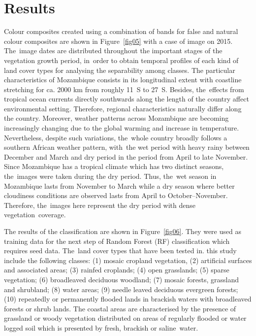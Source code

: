 \documentclass[coasts,article,accept,pdftex,oneauthor]{Definitions/mdpi}
\begin{document}
\section{Results}

Colour composites created using a combination of bands for false and natural colour composites are shown in Figure~\ref{fig05} with a case of image on 2015. The~image dates are distributed throughout the important stages of the vegetation growth period, in~order to obtain temporal profiles of each kind of land cover types for analysing the separability among classes. {The particular characteristics of Mozambique consists in its longitudinal extent with coastline stretching for ca. 2000 km from roughly 11\degree~S to 27\degree~S. Besides, the~effects from tropical ocean currents directly southwards along the length of the country affect environmental setting. Therefore, regional characteristics naturally differ along the country. Moreover, weather patterns across Mozambique are becoming increasingly changing due to the global warming and increase in temperature. Nevertheless, despite such variations, the~whole country broadly follows a southern African weather pattern, with~the wet period with heavy rainy between December and March and dry period in the period from April to late November. }Since Mozambique has a tropical climate which has two distinct seasons, the~images were taken during the dry period. Thus, the~wet season in Mozambique lasts from {November} to March while a dry season where better cloudiness conditions are observed lasts from April to {October--November}. Therefore, the~images here represent the dry period with dense vegetation~coverage.  


The results of the classification {are} shown in Figure~\ref{fig06}{. They }were used as training data for the next step of Random Forest (RF) classification {which requires} seed data. The~land cover types {that have been} tested {in. this study }include {the following classes: }(1) mosaic cropland vegetation, (2) artificial surfaces and associated areas; (3) rainfed croplands; (4) open grasslands; (5) sparse vegetation; (6) broadleaved deciduous woodland; (7) mosaic forests, grassland and shrubland; (8) water areas; (9) needle leaved deciduous evergreen forests; (10) repeatedly or permanently flooded lands in brackish waters with broadleaved forests or shrub lands. {The }coastal areas are characterised by {the presence of }grassland or woody vegetation distributed on {areas of }regularly flooded or water logged soil which is presented by fresh, brackish or saline~water. 
\end{document}
